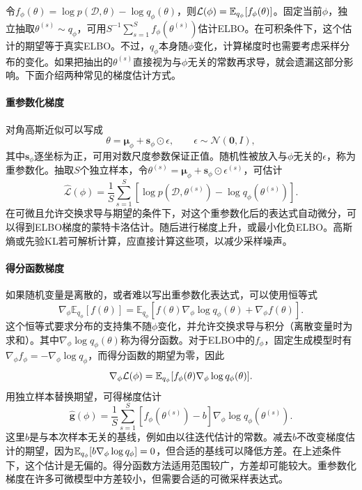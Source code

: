 令$f_\phi(\theta)=\log p(\mathcal D,\theta)-\log q_\phi(\theta)$，则$\mathcal L(\phi)=\mathbb{E}_{q_\phi}[f_\phi(\theta)]$。固定当前$\phi$，独立抽取$\theta^{(s)}\sim q_\phi$，可用$S^{-1}\sum_{s=1}^S f_\phi(\theta^{(s)})$估计ELBO。在可积条件下，这个估计的期望等于真实ELBO。不过，$q_\phi$本身随$\phi$变化，计算梯度时也需要考虑采样分布的变化。如果把抽出的$\theta^{(s)}$直接视为与$\phi$无关的常数再求导，就会遗漏这部分影响。下面介绍两种常见的梯度估计方式。

\paragraph{重参数化梯度}
对角高斯近似可以写成
\begin{equation}
 \theta=\bm\mu_\phi+\bm s_\phi\odot\epsilon,
 \qquad \epsilon\sim\mathcal N(\bm0,I),
 \label{eq:solving-reparameterization}
\end{equation}
其中$\bm s_\phi$逐坐标为正，可用对数尺度参数保证正值。随机性被放入与$\phi$无关的$\epsilon$，称为重参数化。抽取$S$个独立样本，令$\theta^{(s)}=\bm\mu_\phi+\bm s_\phi\odot\epsilon^{(s)}$，可估计
\begin{equation}
 \widehat{\mathcal L}(\phi)=\frac1S\sum_{s=1}^S
 [\log p(\mathcal D,\theta^{(s)})-\log q_\phi(\theta^{(s)})].
\end{equation}
在可微且允许交换求导与期望的条件下，对这个重参数化后的表达式自动微分，可以得到ELBO梯度的蒙特卡洛估计。随后进行梯度上升，或最小化负ELBO。高斯熵或先验KL若可解析计算，应直接计算这些项，以减少采样噪声。

\paragraph{得分函数梯度}
如果随机变量是离散的，或者难以写出重参数化表达式，可以使用恒等式
\begin{equation}
 \nabla_\phi\mathbb E_{q_\phi}[f(\theta)]
 =\mathbb E_{q_\phi}\left[f(\theta)\nabla_\phi\log q_\phi(\theta)
 +\nabla_\phi f(\theta)\right].
 \label{eq:solving-score-function-gradient}
\end{equation}
这个恒等式要求分布的支持集不随$\phi$变化，并允许交换求导与积分（离散变量时为求和）。其中$\nabla_\phi\log q_\phi(\theta)$称为得分函数。对于ELBO中的$f_\phi$，固定生成模型时有$\nabla_\phi f_\phi=-\nabla_\phi\log q_\phi$，而得分函数的期望为零，因此
\begin{equation}
 \nabla_\phi\mathcal L(\phi)
 =\mathbb{E}_{q_\phi}[f_\phi(\theta)\nabla_\phi\log q_\phi(\theta)].
\end{equation}
用独立样本替换期望，可得梯度估计
\begin{equation}
 \widehat{\bm g}(\phi)=\frac1S\sum_{s=1}^S
 [f_\phi(\theta^{(s)})-b]\nabla_\phi\log q_\phi(\theta^{(s)}).
\end{equation}
这里$b$是与本次样本无关的基线，例如由以往迭代估计的常数。减去$b$不改变梯度估计的期望，因为$\mathbb{E}_{q_\phi}[b\nabla_\phi\log q_\phi]=0$，但合适的基线可以降低方差。在上述条件下，这个估计是无偏的。得分函数方法适用范围较广，方差却可能较大。重参数化梯度在许多可微模型中方差较小，但需要合适的可微采样表达式。


